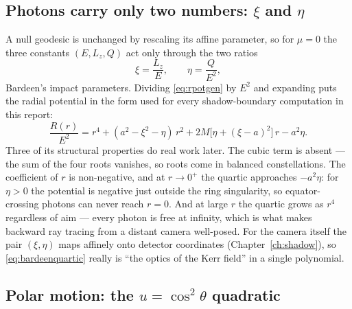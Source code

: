 \subsection{Photons carry only two numbers: $\xi$ and $\eta$}
\label{sec:xieta}

A null geodesic is unchanged by rescaling its affine parameter, so for
$\mu = 0$ the three constants $(E, L_z, Q)$ act only through the two
ratios
\begin{equation}
\xi = \frac{L_z}{E}, \qquad \eta = \frac{Q}{E^2},
\label{eq:xieta}
\end{equation}
Bardeen's impact parameters. Dividing \eqref{eq:rpotgen} by $E^2$ and
expanding puts the radial potential in the form used for every
shadow-boundary computation in this report:
\begin{equation}
\frac{R(r)}{E^2} = r^4 + (a^2 - \xi^2 - \eta)\,r^2
+ 2M\bigl[\eta + (\xi - a)^2\bigr]\,r - a^2\eta .
\label{eq:bardeenquartic}
\end{equation}
Three of its structural properties do real work later. The cubic term
is absent — the sum of the four roots vanishes, so roots come in
balanced constellations. The coefficient of $r$ is non-negative, and at
$r \to 0^+$ the quartic approaches $-a^2\eta$: for $\eta > 0$ the
potential is negative just outside the ring singularity, so
equator-crossing photons can never reach $r = 0$. And at large $r$ the
quartic grows as $r^4$ regardless of aim — every photon is free at
infinity, which is what makes backward ray tracing from a distant
camera well-posed. For the camera itself the pair $(\xi, \eta)$ maps
affinely onto detector coordinates (Chapter~\ref{ch:shadow}), so
\eqref{eq:bardeenquartic} really is ``the optics of the Kerr field''
in a single polynomial.

\subsection{Polar motion: the $u = \cos^2\theta$ quadratic}
\label{sec:polar}

